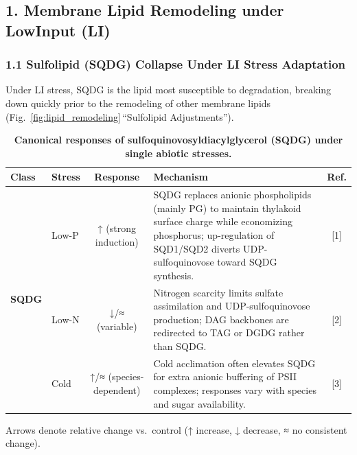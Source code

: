 \documentclass[10pt,letterpaper]{article}
\begin{document}
\subsection*{1. Membrane Lipid Remodeling under LowInput (LI)}

\subsubsection*{1.1 Sulfolipid (SQDG) Collapse Under LI Stress Adaptation}

Under LI stress, SQDG is the lipid most susceptible to degradation, breaking down quickly prior to the remodeling of other membrane lipids (Fig.~\ref{fig:lipid_remodeling}\,“Sulfolipid Adjustments”).


\begin{table}[!ht]
  \centering
  \caption{\bf Canonical responses of sulfoquinovosyldiacylglycerol (SQDG) under single abiotic stresses.}
  \label{table:SQDG_responses}
  \begin{tabular}{@{} l l c p{6cm} c @{}}
    \toprule
    \textbf{Class} 
      & \textbf{Stress} 
      & \textbf{Response} 
      & \textbf{Mechanism} 
      & \textbf{Ref.} \\
    \midrule
    \multirow{3}{*}{\textbf{SQDG}}
      & Low-P  & ↑ (strong induction)   
               & SQDG replaces anionic phospholipids (mainly PG) to maintain thylakoid surface charge while economizing phosphorus; up-regulation of SQD1/SQD2 diverts UDP-sulfoquinovose toward SQDG synthesis. 
               & [1] \\
      & Low-N  & ↓/≈ (variable)         
               & Nitrogen scarcity limits sulfate assimilation and UDP-sulfoquinovose production; DAG backbones are redirected to TAG or DGDG rather than SQDG. 
               & [2] \\
      & Cold   & ↑/≈ (species-dependent)
               & Cold acclimation often elevates SQDG for extra anionic buffering of PSII complexes; responses vary with species and sugar availability. 
               & [3] \\
    \bottomrule
  \end{tabular}
  \begin{flushleft}
    {\footnotesize Arrows denote relative change vs.\ control (↑ increase, ↓ decrease, ≈ no consistent change).}
  \end{flushleft}
\end{table}
\end{document}
